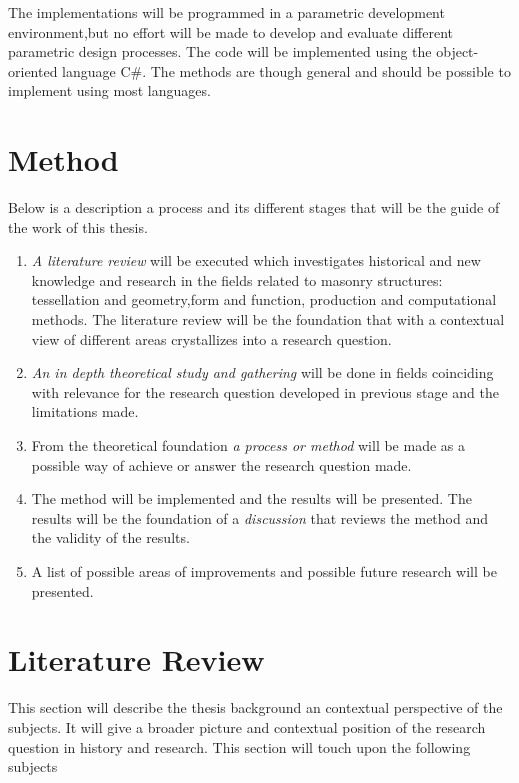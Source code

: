 The implementations will be programmed in a parametric development environment,but no effort will be made to develop and evaluate different parametric design processes. The code will be implemented using the object-oriented language C\#. The methods are though general and should be possible to implement using most languages. 

\section{Method} \label{Sec:method}

Below is a description a process and its  different stages that will be the guide of the work of this thesis.

\begin{enumerate}

\item \textit{A literature review} will be executed which investigates historical and new knowledge and research in the fields related to masonry structures: tessellation and geometry,form and function, production  and computational methods. The literature review will be the foundation that with a contextual view of different areas crystallizes into a research question.
\item \textit{ An in depth theoretical study and gathering} will be done in fields coinciding with relevance for the research question developed in previous stage and the limitations made.  
\item From the theoretical foundation \textit{a process or method} will be made as a possible way of achieve or answer the research question made.
\item The method will be implemented and the results will be presented. The results will be the foundation of a \textit{discussion} that reviews the method and the validity of the results.
\item A list of possible areas of improvements and possible future research will be presented.
\end{enumerate}


\section{Literature Review}

This section will describe the thesis background an contextual perspective of the subjects. It will give a broader picture and contextual position of the research question in history and research. This section will touch upon the following subjects

